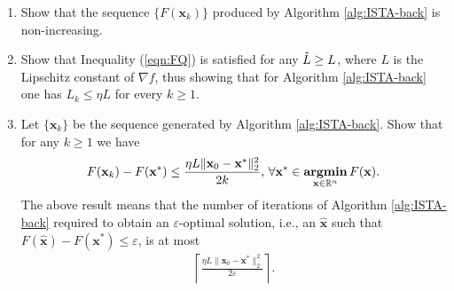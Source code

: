 \documentclass[11pt,letter,notitlepage]{article}
\DeclareMathOperator*{\argmin}{\bf argmin}
\begin{document}
\begin{exercise}
\begin{algorithm}[H]
\begin{algorithmic}[1]
	\end{algorithmic}
\end{algorithm}

\begin{enumerate}
    \item Show that the sequence $\{F(\textbf{x}_k)\}$ produced by Algorithm \ref{alg:ISTA-back} is non-increasing.
    
    \item Show that Inequality (\ref{eqn:FQ}) is satisfied for any $\Tilde{L}\ge L$, where $L$ is the Lipschitz constant of $\nabla f$, thus showing that for Algorithm \ref{alg:ISTA-back} one has $L_k\le \eta L$ for every $k\ge 1$.
    
    \item Let $\{\textbf{x}_k\}$ be the sequence generated by Algorithm \ref{alg:ISTA-back}. Show that for any $k\ge 1$ we have
    \begin{align*}
        F(\textbf{x}_k)-F(\textbf{x}^*)\le \frac{\eta L \|\textbf{x}_0-\textbf{x}^*\|_2^2}{2k},\,\forall \textbf{x}^*\in \argmin_{\textbf{x}\in\mathbb{R}^n} F(\textbf{x}).
    \end{align*}
    The above result means that the number of iterations of Algorithm \ref{alg:ISTA-back} required to obtain an $\varepsilon$-optimal solution, i.e., an $\hat{\textbf{x}}$ such that $F(\hat{\textbf{x}})-F(\textbf{x}^*)\le \varepsilon$, is at most
    \begin{align*}
        \left\lceil \frac{\eta L \|\textbf{x}_0-\textbf{x}^*\|_2^2}{2\varepsilon} \right\rceil.
    \end{align*}
\end{enumerate}


\end{exercise}
\begin{solution}

\end{solution}
\end{document}

